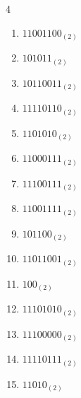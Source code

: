 \begin{multicols}{4}
\begin{enumerate}
        \phantom{$=151$}

  \item $11001100_{(2)}$

        \phantom{$=204$}

\columnbreak %

  \item $101011_{(2)}$

        \phantom{$=43$}

  \item $10110011_{(2)}$

        \phantom{$=179$}

  \item $11110110_{(2)}$

        \phantom{$=246$}

  \item $1101010_{(2)}$

        \phantom{$=106$}

  \item $11000111_{(2)}$

        \phantom{$=199$}

  \item $11100111_{(2)}$

        \phantom{$=231$}

  \item $11001111_{(2)}$

        \phantom{$=207$}

  \item $101100_{(2)}$

        \phantom{$=44$}

  \item $11011001_{(2)}$

        \phantom{$=217$}

  \item $100_{(2)}$

        \phantom{$=4$}

  \item $11101010_{(2)}$

        \phantom{$=234$}

  \item $11100000_{(2)}$

        \phantom{$=224$}

  \item $11110111_{(2)}$

        \phantom{$=247$}

  \item $11010_{(2)}$


\end{enumerate}
\end{multicols}
